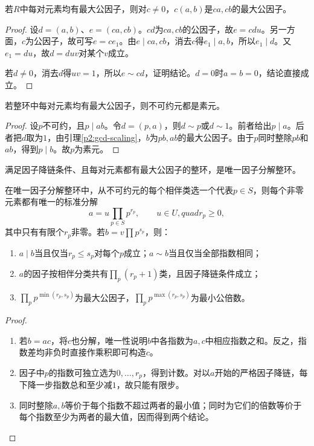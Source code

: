 \begin{lemma}\label{p2:gcd-scaling}
若$R$中每对元素均有最大公因子，则对$c\ne0$，$c(a,b)$是$ca,cb$的最大公因子。
\end{lemma}
\begin{proof}
设$d=(a,b)$、$e=(ca,cb)$。$cd$为$ca,cb$的公因子，故$e=cdu$。另一方面，$c$为公因子，故可写$e=ce_1$。由$e\mid ca,cb$，消去$c$得$e_1\mid a,b$，所以$e_1\mid d$。又$e_1=du$，故$d=duv$对某个$v$成立。

若$d\ne0$，消去$d$得$uv=1$，所以$e\sim cd$，证明结论。$d=0$时$a=b=0$，结论直接成立。
\end{proof}

\begin{lemma}
若整环中每对元素均有最大公因子，则不可约元都是素元。
\end{lemma}
\begin{proof}
设$p$不可约，且$p\mid ab$。令$d=(p,a)$，则$d\sim p$或$d\sim1$。前者给出$p\mid a$。后者把$d$取为$1$，由引理\ref{p2:gcd-scaling}，$b$为$pb,ab$的最大公因子。由于$p$同时整除$pb$和$ab$，得到$p\mid b$。故$p$为素元。
\end{proof}

\begin{corollary}
满足因子降链条件、且每对元素都有最大公因子的整环，是唯一因子分解整环。
\end{corollary}

\begin{proposition}
在唯一因子分解整环中，从不可约元的每个相伴类选一个代表$p\in S$，则每个非零元素都有唯一的标准分解
\[
a=u\prod_{p\in S}p^{r_p},\qquad u\in U,quad r_p\ge0,
\]
其中只有有限个$r_p$非零。若$b=v\prod p^{s_p}$，则：
\begin{enumerate}
\item $a\mid b$当且仅当$r_p\le s_p$对每个$p$成立；$a\sim b$当且仅当全部指数相同；
\item $a$的因子按相伴分类共有$\prod_p(r_p+1)$类，且因子降链条件成立；
\item $\prod_p p^{\min(r_p,s_p)}$为最大公因子，$\prod_p p^{\max(r_p,s_p)}$为最小公倍数。
\end{enumerate}
\end{proposition}
\begin{proof}
\begin{enumerate}
\item 若$b=ac$，将$c$也分解，唯一性说明$b$中各指数为$a,c$中相应指数之和。反之，指数差均非负时直接作乘积即可构造$c$。
\item 因子中$p$的指数可独立选为$0,\ldots,r_p$，得到计数。对以$a$开始的严格因子降链，每下降一步指数总和至少减$1$，故只能有限步。
\item 同时整除$a,b$等价于每个指数不超过两者的最小值；同时为它们的倍数等价于每个指数至少为两者的最大值，因而得到两个结论。
\end{enumerate}
\end{proof}

